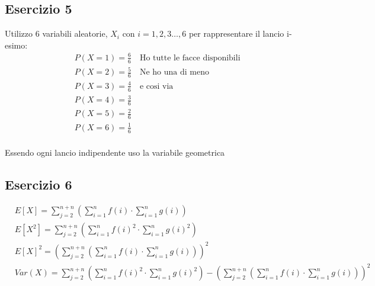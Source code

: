 \documentclass[12pt]{article}
\begin{document}
\subsection*{Esercizio 5}
Utilizzo 6 variabili aleatorie, \(X_i\) con \(i = 1,2,3\dots, 6\) per rappresentare il lancio i-esimo:
\begin{align*}
    &P(X = 1) = \frac{6}{6} \quad \text{Ho tutte le facce disponibili} \\
    &P(X = 2) = \frac{5}{6} \quad \text{Ne ho una di meno}\\
    &P(X = 3) = \frac{4}{6} \quad \text{e cosi via}\\
    &P(X = 4) = \frac{3}{6} \\
    &P(X = 5) = \frac{2}{6}\\
    &P(X = 6) = \frac{1}{6}\\
\end{align*}

Essendo ogni lancio indipendente uso la variabile geometrica 
\subsection*{Esercizio 6}

\begin{align}
    &E[X] = \sum_{j=2}^{n+n}(\sum_{i=1}^{n} f(i) \cdot \sum_{i=1}^{n} g(i)) \\
    &E[X^2] = \sum_{j=2}^{n+n}(\sum_{i=1}^{n} f(i)^2 \cdot \sum_{i=1}^{n} g(i)^2) \\    
    &E[X]^2 = (\sum_{j=2}^{n+n}(\sum_{i=1}^{n} f(i) \cdot \sum_{i=1}^{n} g(i)))^2 \\
    &Var(X) = \sum_{j=2}^{n+n}(\sum_{i=1}^{n} f(i)^2 \cdot \sum_{i=1}^{n} g(i)^2) - (\sum_{j=2}^{n+n}(\sum_{i=1}^{n} f(i) \cdot \sum_{i=1}^{n} g(i)))^2 
\end{align}
\end{document}
